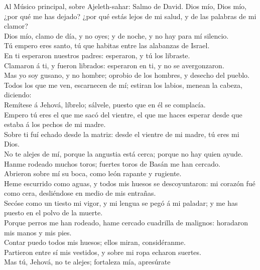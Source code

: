  Al Músico principal, sobre Ajeleth-sahar: Salmo de David.
Dios mío, Dios mío, ¿por qué me has dejado? ¿por qué estás lejos de mi
salud, y de las palabras de mi clamor?\\
 Dios mío, clamo de día, y no oyes; y de noche, y no hay
para mí silencio.\\
 Tú empero eres santo, tú que habitas entre las alabanzas
de Israel.\\
 En ti esperaron nuestros padres: esperaron, y tú los
libraste.\\
 Clamaron á ti, y fueron librados: esperaron en ti, y no
se avergonzaron.\\
 Mas yo soy gusano, y no hombre; oprobio de los hombres, y
desecho del pueblo.\\
 Todos los que me ven, escarnecen de mí; estiran los
labios, menean la cabeza, diciendo:\\
 Remítese á Jehová, líbrelo; sálvele, puesto que en él se
complacía.\\
 Empero tú eres el que me sacó del vientre, el que me
haces esperar desde que estaba á los pechos de mi madre.\\
 Sobre ti fuí echado desde la matriz: desde el vientre de
mi madre, tú eres mi Dios.\\
 No te alejes de mí, porque la angustia está cerca;
porque no hay quien ayude.\\
 Hanme rodeado muchos toros; fuertes toros de Basán me
han cercado.\\
 Abrieron sobre mí su boca, como león rapante y
rugiente.\\
 Heme escurrido como aguas, y todos mis huesos se
descoyuntaron: mi corazón fué como cera, desliéndose en medio de mis
entrañas.\\
 Secóse como un tiesto mi vigor, y mi lengua se pegó á mi
paladar; y me has puesto en el polvo de la muerte.\\
 Porque perros me han rodeado, hame cercado cuadrilla de
malignos: horadaron mis manos y mis pies.\\
 Contar puedo todos mis huesos; ellos miran,
considéranme.\\
 Partieron entre sí mis vestidos, y sobre mi ropa echaron
suertes.\\
 Mas tú, Jehová, no te alejes; fortaleza mía, apresúrate

